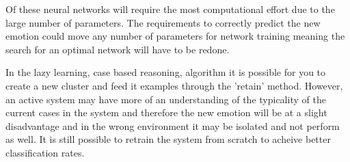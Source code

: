 \documentclass[11pt]{article}
\begin{document}
Of these neural networks will require the most computational effort due to the large number of parameters. The requirements to correctly predict the new emotion could move any number of parameters for network training meaning the search for an optimal network will have to be redone.

In the lazy learning, case based reasoning, algorithm it is possible for you to create a new cluster and feed it examples through the 'retain' method. However, an active system may have more of an understanding of the typicality of the current cases in the system and therefore the new emotion will be at a slight disadvantage and in the wrong environment it may be isolated and not perform as well. It is still possible to retrain the system from scratch to acheive better classification rates.
\end{document}
